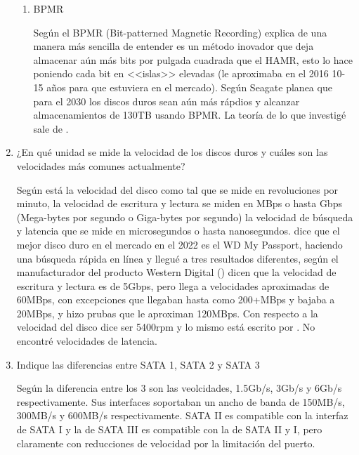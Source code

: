 \documentclass[stu, 12pt, letterpaper, donotrepeattitle, floatsintext, natbib, helv]{apa7}
\begin{document}
\begin{enumerate}
\begin{enumerate}
        \item BPMR
        
        Según \cite{BPMREasy} el BPMR (Bit-patterned Magnetic Recording) explica de una manera más sencilla de entender es un método inovador que deja almacenar aún más bits por pulgada cuadrada que el HAMR, esto lo hace poniendo cada bit en <<islas>> elevadas (le aproximaba en el 2016 10-15 años para que estuviera en el mercado). Según \cite{BPMRFutureUse} Seagate planea que para el 2030 los discos duros sean aún más rápdios y alcanzar almacenamientos de 130TB usando BPMR. La teoría de lo que investigé sale de \cite{BPMRResearch}.

    \end{enumerate}
    
    \item ¿En qué unidad se mide la velocidad de los discos duros y cuáles son las velocidades más comunes actualmente?
    
    Según \cite{DiscosDuros} está la velocidad del disco como tal que se mide en revoluciones por minuto, la velocidad de escritura y lectura se miden en MBps o hasta Gbps (Mega-bytes por segundo o Giga-bytes por segundo) la velocidad de búsqueda y latencia que se mide en microsegundos o hasta nanosegundos. \cite{TomsHardwareHDD} dice que el mejor disco duro en el mercado en el 2022  es el WD My Passport, haciendo una búsqueda rápida en línea y llegué a tres resultados diferentes, según el manufacturador del producto Western Digital (\cite{WesternDigitalMyPassport}) dicen que la velocidad de escritura y lectura es de 5Gbps, pero \cite{MyPassportSpeed} llega a velocidades aproximadas de 60MBps, con excepciones que llegaban hasta como 200+MBps y bajaba a 20MBps, y \cite{PCMagMyPassport} hizo prubas que le aproximan 120MBps. Con respecto a la velocidad del disco \cite{MyPassportSpeed} dice ser 5400rpm y lo mismo está escrito por \cite{PCMagMyPassport}. No encontré velocidades de latencia.

    \item Indique las diferencias entre SATA 1, SATA 2 y SATA 3
    
    Según \cite{SATA123} la diferencia entre los 3 son las veolcidades, 1.5Gb/s, 3Gb/s y 6Gb/s respectivamente. Sus interfaces soportaban un ancho de banda de 150MB/s, 300MB/s y 600MB/s respectivamente. SATA II es compatible con la interfaz de SATA I y la de SATA III es compatible con la de SATA II y I, pero claramente con reducciones de velocidad por la limitación del puerto.


\end{enumerate}
\end{document}
